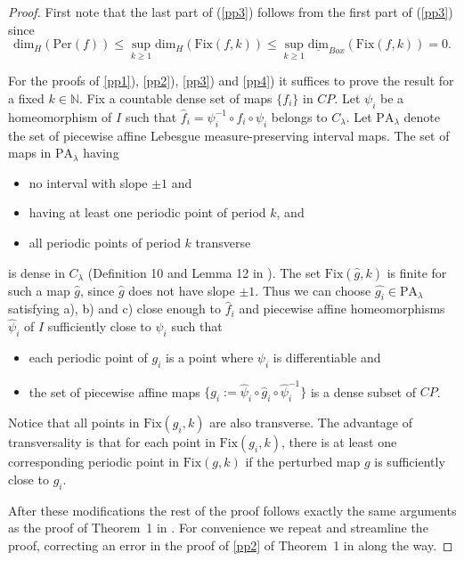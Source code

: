 \documentclass[12pt, a4paper]{amsart}
\def\N{{\mathbb N}}
\def\le{\leqslant}
\def\ge{\geqslant}
\def\per{\mathrm{Per}}
\newcommand{\?}{{\bf ???}}
\newcommand{\fix}{\mathrm{Fix}}
\begin{document}
\begin{proof}
First note that  the last part of (\ref{pp3}) follows from the first part of (\ref{pp3}) since 
 $$\mathrm{dim}_H(\per(f)) \le \sup_{k \ge 1} \mathrm{dim}_H(\fix(f,k)) \le \sup_{k \ge 1} \underline{\mathrm{dim}}_{Box}(\fix(f,k)) = 0.$$

For the proofs of \ref{pp1}), \ref{pp2}), \ref{pp3}) and \ref{pp4}) it suffices to prove the result for a  fixed $k \in \N$.
 Fix a countable dense set of maps $\{f_i\}$ in $CP$. 
Let $\psi_i$ be a homeomorphism of $I$ such that 
$\hat{f}_i = \psi_i^{-1} \circ f_i \circ \psi_i$ belongs to $C_{\lambda}$. Let $\mathrm{PA}_{\lambda}$ denote the set of piecewise affine Lebesgue measure-preserving interval maps.
The set of maps in $\mathrm{PA}_{\lambda}$ having  
\begin{itemize}
\item[{a)}] no interval with slope $\pm 1$ and  
\item[{b)}]  having at least one periodic point of period $k$, and 
\item[{c)}]  all periodic points of period $k$ transverse
\end{itemize}
is dense in $C_{\lambda}$  (Definition 10 and Lemma 12 in \cite{BCOT}).
The set $\fix(\hat{g},k)$ is finite for such a map $\hat g$, since $\hat g$ does not have slope $\pm 1$.  
Thus we can choose $\hat{g_i} \in \mathrm{PA}_{\lambda}$  satisfying  a), b) and c) close enough to $\hat f_i$
and piecewise  affine homeomorphisms $\hat \psi_i$ of $I$ sufficiently close to  $\psi_i$ such that
\begin{itemize}
\item[(i)] each periodic point of $g_i$ is a point where  $\psi_i$ is differentiable  and 
\item[(ii)] the set of piecewise affine maps $\{g_i :=\hat  \psi_i \circ \hat g_i \circ \hat \psi_i^{-1}\}$ is 
a dense subset of $CP$. 
\end{itemize}
Notice that all points in  $\fix(g_i,k)$ are also transverse.
The advantage of transversality is that for each point in $\fix(g_i,k)$, there is at least one  corresponding periodic
point in $\fix(g,k)$ if the perturbed map $g$ is sufficiently close to $g_i$.

  After these modifications the rest of the proof  follows exactly the same arguments as the proof of Theorem~1 in \cite{BCOT}. For convenience we repeat and streamline the proof, correcting an error in the proof of \eqref{pp2} of Theorem~1 in \cite{BCOT} along the way. 



\end{proof}
\end{document}
